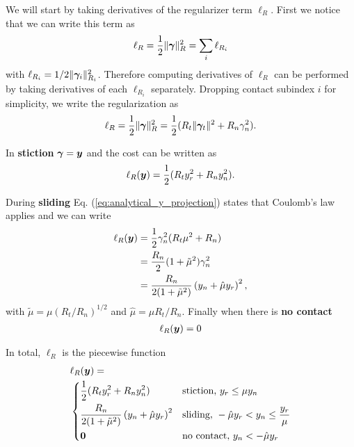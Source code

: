 We will start by taking derivatives of the regularizer term $\ell_R$. First we
notice that we can write this term as
\begin{equation*}
	\ell_R = \frac{1}{2}\Vert{\bm\gamma}\Vert_{R}^2 = 
	\sum_i \ell_{R_i}
\end{equation*}
with $\ell_{R_i}=1/2\Vert{\bm\gamma}_i\Vert_{R_i}^2$. Therefore computing
derivatives of $\ell_R$ can be performed by taking derivatives of each
$\ell_{R_i}$ separately. Dropping contact subindex $i$ for simplicity, we write the regularization as
\begin{eqnarray*}
	\ell_R = \frac{1}{2}\Vert{\bm\gamma}\Vert_R^2=\frac{1}{2}(R_t\Vert{\bm\gamma}_t\Vert^2+R_n\gamma_n^2).
\end{eqnarray*}

In \textbf{stiction} ${\bm\gamma}={\bm{y}}$ and the cost can be written as
\begin{eqnarray*}
	\ell_R({\bm{y}}) = \frac{1}{2}(R_t y_r^2+R_n y_n^2).
\end{eqnarray*}

During \textbf{sliding} Eq. (\ref{eq:analytical_y_projection}) states that Coulomb's law applies and we can write
\begin{align*}
	\ell_R({\bm{y}})
	&=\frac{1}{2}\gamma_n^2(R_t\mu^2+R_n)\\
	&=\frac{R_n}{2}(1+\tilde\mu^2)\gamma_n^2\\
	&=\frac{R_n}{2(1+\tilde\mu^2)}\left(y_n + \hat\mu y_r\right)^2,
\end{align*}
with $\tilde{\mu}=\mu (R_t/R_n)^{1/2}$ and $\hat{\mu}=\mu R_t/R_n$. Finally when there is \textbf{no contact}
\begin{eqnarray*}
	\ell_R({\bm{y}}) = 0
\end{eqnarray*}

In total, $\ell_R$ is the piecewise function
\begin{align}
	&\ell_R(\vf{y}) = 
	\label{eq:ell_R_piecewise}\\	
&\begin{dcases}
	\frac{1}{2}(R_t y_r^2+R_n y_n^2) & \text{stiction, } y_r \le \mu y_n\\
	\frac{R_n}{2(1+\tilde\mu^2)}\left(y_n + \hat\mu y_r\right)^2 & \text{sliding, } -\hat\mu y_r < y_n \leq \frac{y_r}{\mu}\\
    \vf{0} & \text{no contact, } y_n < -\hat\mu y_r
\end{dcases}\nonumber	
\end{align}

